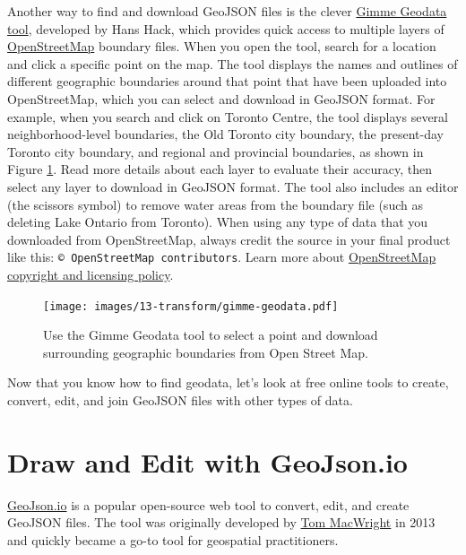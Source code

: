 \documentclass[
  english,
]{book}
\begin{document}
Another way to find and download GeoJSON files is the clever \href{https://hanshack.com/geotools/}{Gimme Geodata tool}, developed by Hans Hack, which provides quick access to multiple layers of \href{https://openstreetmap.org}{OpenStreetMap} boundary files. When you open the tool, search for a location and click a specific point on the map. The tool displays the names and outlines of different geographic boundaries around that point that have been uploaded into OpenStreetMap, which you can select and download in GeoJSON format. For example, when you search and click on Toronto Centre, the tool displays several neighborhood-level boundaries, the Old Toronto city boundary, the present-day Toronto city boundary, and regional and provincial boundaries, as shown in Figure \ref{fig:gimme-geodata}. Read more details about each layer to evaluate their accuracy, then select any layer to download in GeoJSON format. The tool also includes an editor (the scissors symbol) to remove water areas from the boundary file (such as deleting Lake Ontario from Toronto). When using any type of data that you downloaded from OpenStreetMap, always credit the source in your final product like this: \texttt{©\ OpenStreetMap\ contributors}. Learn more about \href{https://www.openstreetmap.org/copyright}{OpenStreetMap copyright and licensing policy}.



\begin{figure}
\centering
\texttt{[image: images/13-transform/gimme-geodata.pdf]}
\caption{\label{fig:gimme-geodata}Use the Gimme Geodata tool to select a point and download surrounding geographic boundaries from Open Street Map.}
\end{figure}

Now that you know how to find geodata, let's look at free online tools to create, convert, edit, and join GeoJSON files with other types of data.

\hypertarget{geojsonio}{%
\section*{Draw and Edit with GeoJson.io}\label{geojsonio}}

\href{https://geojson.io}{GeoJson.io} is a popular open-source web tool to convert,
edit, and create GeoJSON files. The tool was originally developed by
\href{https://macwright.org/about/}{Tom MacWright} in 2013
and quickly became a go-to tool for geospatial practitioners.
\end{document}
